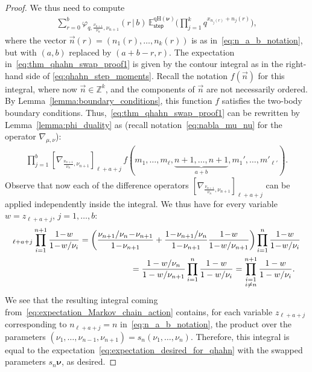 \documentclass[11pt]{article}
\numberwithin{equation}{section}
\numberwithin{equation}{section}
\begin{document}
\begin{proof}
	We thus need to compute
	\begin{gather}
		\label{eq:thm_qhahn_swap_proof1}
		\sum_{r=0}^{b}
		\varphi_{q,\frac{\nu_{n+1}}{\nu_n},\nu_{n+1}}
		(r\,|\, b)
		\,\mathbb{E}^{\mathrm{qH}(\boldsymbol\nu)}_{\mathsf{step}}
		\biggl(\prod_{j=1}^{k}
		q^{x_{n_j(r)}+n_j(r)}\biggr),
	\end{gather}
	where the vector
	$\vec n(r)=(n_1(r),\ldots,n_k(r) )$
	is as in~\eqref{eq:n_a_b_notation},
	but with $(a,b)$ replaced by $(a+b-r,r)$.
	The expectation in~\eqref{eq:thm_qhahn_swap_proof1}
	is given by the contour integral as in the right-hand side of
	\eqref{eq:qhahn_step_moments}.
	Recall the notation $f(\vec n)$ for this integral, where now $\vec n\in \mathbb{Z}^k$,
	and the components of $\vec n$ are not necessarily ordered.
	By Lemma~\ref{lemma:boundary_conditions}, this function $f$ satisfies the two-body boundary conditions.
	Thus,~\eqref{eq:thm_qhahn_swap_proof1} can be rewritten by Lemma~\ref{lemma:phi_duality}
	as (recall notation~\eqref{eq:nabla_mu_nu} for
	the operator
	$\nabla_{\mu,\nu}$):
	\begin{gather*}
		\prod_{j=1}^{b}\left[ \nabla_{\frac{\nu_{n+1}}{\nu_n},\nu_{n+1}} \right]_{\ell+a+j}\,
		f(m_1,\ldots,m_\ell,\underbrace{n+1,\ldots,n+1 }_{a+b},m_1',\ldots,m'_{\ell'}).
	\end{gather*}
	Observe that now
	each of the difference operators
	$[ \nabla_{\frac{\nu_{n+1}}{\nu_n},\nu_{n+1}} ]_{\ell+a+j}$
	can be applied independently
	inside the integral. We thus have for every variable $w=z_{\ell+a+j}$,
	$j=1,\ldots,b $:
	\begin{gather*}
	[\nabla_{\frac{\nu_{n+1}}{\nu_n},\nu_{n+1}}]_{\ell+a+j}
	\prod_{i=1}^{n+1}\frac{1\!-\!w}{1\!-\!w/\nu_i}
	=	\bigg( \frac{\nu_{n+1}/\nu_n\!-\!\nu_{n+1}}{1\!-\!\nu_{n+1}}+
	\frac{1\!-\!\nu_{n+1}/\nu_n}{1\!-\!\nu_{n+1}}\frac{1\!-\!w}{1\!-\!w/\nu_{n+1}} \bigg)
	\prod_{i=1}^{n}\frac{1\!-\!w}{1\!-\!w/\nu_i}
	\\ \hphantom{[\nabla_{\frac{\nu_{n+1}}{\nu_n},\nu_{n+1}}]_{\ell+a+j}
	\prod_{i=1}^{n+1}\frac{1\!-\!w}{1\!-\!w/\nu_i}}
{}=	\frac{1-w/\nu_n}{1-w/\nu_{n+1}}	\prod_{i=1}^{n}\frac{1-w}{1-w/\nu_i}
	=\prod_{\substack{i=1\\i\ne n}}^{n+1}\frac{1-w}{1-w/\nu_i}.
	\end{gather*}
	We see that the
	resulting integral coming from~\eqref{eq:expectation_Markov_chain_action}
	contains, for each variable
	$z_{\ell+a+j}$ corresponding to $n_{\ell+a+j}=n$ in~\eqref{eq:n_a_b_notation}, the product over the
	parameters $(\nu_1,\ldots,\nu_{n-1},\nu_{n+1} )=s_n(\nu_1,\ldots,\nu_{n} )$.
	Therefore, this integral is equal to the
	expectation~\eqref{eq:expectation_desired_for_qhahn}
	with the swapped parameters $s_n\boldsymbol\nu$, as desired.


\end{proof}
\end{document}

